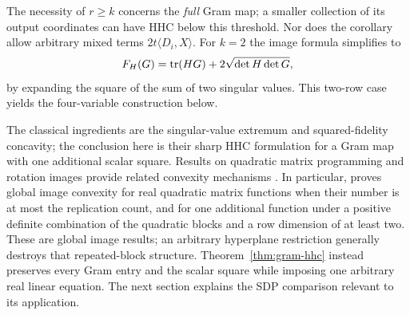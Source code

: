 The necessity of $r\geq k$ concerns the \emph{full} Gram map; a
smaller collection of its output coordinates can have HHC below this
threshold. Nor does the corollary allow arbitrary mixed terms
$2t\langle D_i,X\rangle$. For $k=2$ the image formula simplifies to
\[
 F_H(G)=\operatorname{tr}(HG)+2\sqrt{\det H\det G},
\]
by expanding the square of the sum of two singular values. This
two-row case yields the four-variable construction below.

The classical ingredients are the singular-value extremum and
squared-fidelity concavity; the conclusion here is their sharp HHC
formulation for a Gram map with one additional scalar square. Results
on quadratic matrix programming and rotation images provide related
convexity mechanisms
\citep{Beck2007,RamachandranShuWang2025}. In particular,
\citet[Theorems~3.1 and~3.4]{Beck2009} proves global image convexity
for real quadratic matrix functions when their number is at most the
replication count, and for one additional function under a positive
definite combination of the quadratic blocks and a row dimension of
at least two. These are global image results; an arbitrary hyperplane
restriction generally destroys that repeated-block structure.
Theorem~\ref{thm:gram-hhc} instead preserves every Gram entry and
the scalar square while imposing one arbitrary real linear equation.
The next section explains the SDP comparison relevant to its application.
